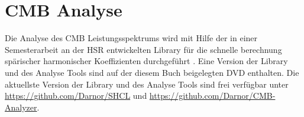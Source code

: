 \section{CMB Analyse}

Die Analyse des CMB Leistungsspektrums wird mit Hilfe der in einer 
Semesterarbeit an der HSR entwickelten Library für die schnelle berechnung 
spärischer harmonischer Koeffizienten durchgeführt \cite{cmb:SA_Patzen}. Eine 
Version der Library und des Analyse Tools sind auf der diesem Buch beigelegten 
DVD enthalten. Die aktuellste Version der Library und des Analyse Tools sind 
frei verfügbar unter \url{https://github.com/Darnor/SHCL} und 
\url{https://github.com/Darnor/CMB-Analyzer}.






